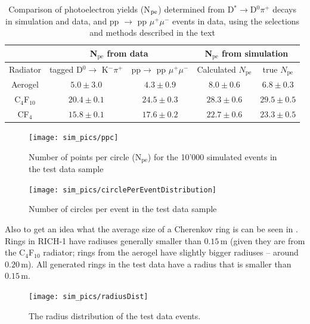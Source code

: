 \documentclass[11pt,twoside]{scrreprt}
\begin{document}
\begin{table}[tb]
\centering
\begin{tabular}{|c| c| c | c |c|}
\hline\hline
 & \multicolumn{2}{|c|}{N$_{\text{pe}}$ from data} & \multicolumn{2}{|c|}{N$_{\text{pe}}$ from simulation} \\ \hline
Radiator &  tagged D$^0 \rightarrow$ K$^- \pi^+$ &pp$ \rightarrow$ pp $\mu^+ \mu^-$ & Calculated $N_{\text{pe}}$ & 
true $N_{\text{pe}}$ \\ [0.5ex]
\hline
Aerogel & $5.0 \pm 3.0$  & $4.3 \pm 0.9$& $8.0 \pm 0.6$ & $6.8 \pm 0.3$ \\ \hline
C$_4$F$_{10}$  & $20.4 \pm 0.1$ & $24.5 \pm 0.3$& $28.3 \pm 0.6$ & $29.5 \pm 0.5$ \\ \hline
CF$_4$ & $ 15.8 \pm 0.1$  & $ 17.6 \pm 0.2$& $22.7 \pm 0.6$ & $23.3 \pm 0.5$ \\ 
\hline
\end{tabular}
\caption[Comparison of photoelectron yields (N$_{\rm pe}$)]{Comparison of photoelectron yields (N$_{\rm pe}$) determined from
D$^* \rightarrow$D$^0\pi^+$ decays in simulation and data, and 
pp $\rightarrow$ pp $\mu^+ \mu^-$ events in data, using the selections and 
methods described in the text \cite{RICHPerf2012}}
\label{table:results}
\end{table}

\begin{figure}[tb]
  \centering
  \texttt{[image: sim\_pics/ppc]}
  \caption{Number of points per circle (N$_\text{pe}$) for the 10'000 simulated events in the test data sample}
  \label{fig:ppc1}
\end{figure}

\begin{figure}[tb]
  \centering
  \texttt{[image: sim\_pics/circlePerEventDistribution]}
  \caption{Number of circles per event in the test data sample}
  \label{fig:circlePerEventDist}
\end{figure}

Also to get an idea what the average size of a Cherenkov ring is can be seen in
\cite{Forty1999}. Rings in RICH-1 have radiuses generally smaller than $0.15$\,m
(given they are from the C$_4$F$_{10}$ radiator; rings from the aerogel have
slightly bigger radiuses -- around $0.20$\,m). All generated rings in the test data 
have a radius that is smaller than $0.15$\,m.

\begin{figure}[tb]
  \centering
  \texttt{[image: sim\_pics/radiusDist]}
  \caption{The radius distribution of the test data events.}
  \label{fig:radius_dist}
\end{figure}
\end{document}
